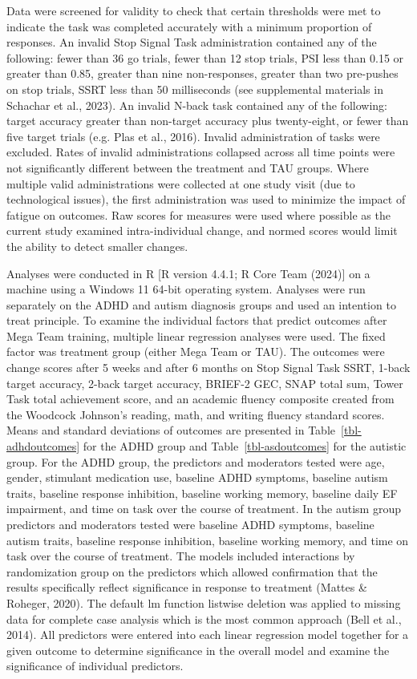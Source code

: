 \documentclass[
  letterpaper,
]{ut-thesis}
\begin{document}
Data were screened for validity to check that certain thresholds were
met to indicate the task was completed accurately with a minimum
proportion of responses. An invalid Stop Signal Task administration
contained any of the following: fewer than 36 go trials, fewer than 12
stop trials, PSI less than 0.15 or greater than 0.85, greater than nine
non-responses, greater than two pre-pushes on stop trials, SSRT less
than 50 milliseconds (see supplemental materials in Schachar et al.,
2023). An invalid N-back task contained any of the following: target
accuracy greater than non-target accuracy plus twenty-eight, or fewer
than five target trials (e.g. Plas et al., 2016). Invalid administration
of tasks were excluded. Rates of invalid administrations collapsed
across all time points were not significantly different between the
treatment and TAU groups. Where multiple valid administrations were
collected at one study visit (due to technological issues), the first
administration was used to minimize the impact of fatigue on outcomes.
Raw scores for measures were used where possible as the current study
examined intra-individual change, and normed scores would limit the
ability to detect smaller changes.

Analyses were conducted in R {[}R version 4.4.1; R Core Team (2024){]}
on a machine using a Windows 11 64-bit operating system. Analyses were
run separately on the ADHD and autism diagnosis groups and used an
intention to treat principle. To examine the individual factors that
predict outcomes after Mega Team training, multiple linear regression
analyses were used. The fixed factor was treatment group (either Mega
Team or TAU). The outcomes were change scores after 5 weeks and after 6
months on Stop Signal Task SSRT, 1-back target accuracy, 2-back target
accuracy, BRIEF-2 GEC, SNAP total sum, Tower Task total achievement
score, and an academic fluency composite created from the Woodcock
Johnson's reading, math, and writing fluency standard scores. Means and
standard deviations of outcomes are presented in
Table~\ref{tbl-adhdoutcomes} for the ADHD group and
Table~\ref{tbl-asdoutcomes} for the autistic group. For the ADHD group,
the predictors and moderators tested were age, gender, stimulant
medication use, baseline ADHD symptoms, baseline autism traits, baseline
response inhibition, baseline working memory, baseline daily EF
impairment, and time on task over the course of treatment. In the autism
group predictors and moderators tested were baseline ADHD symptoms,
baseline autism traits, baseline response inhibition, baseline working
memory, and time on task over the course of treatment. The models
included interactions by randomization group on the predictors which
allowed confirmation that the results specifically reflect significance
in response to treatment (Mattes \& Roheger, 2020). The default lm
function listwise deletion was applied to missing data for complete case
analysis which is the most common approach (Bell et al., 2014). All
predictors were entered into each linear regression model together for a
given outcome to determine significance in the overall model and examine
the significance of individual predictors.
\end{document}
